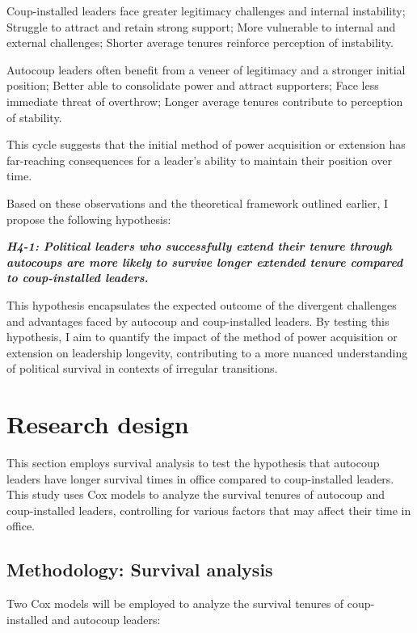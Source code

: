 \documentclass[
  12pt,
]{report}
\begin{document}
Coup-installed leaders face greater legitimacy challenges and internal
instability; Struggle to attract and retain strong support; More
vulnerable to internal and external challenges; Shorter average tenures
reinforce perception of instability.

Autocoup leaders often benefit from a veneer of legitimacy and a
stronger initial position; Better able to consolidate power and attract
supporters; Face less immediate threat of overthrow; Longer average
tenures contribute to perception of stability.

This cycle suggests that the initial method of power acquisition or
extension has far-reaching consequences for a leader's ability to
maintain their position over time.

Based on these observations and the theoretical framework outlined
earlier, I propose the following hypothesis:

\textbf{\emph{H4-1: Political leaders who successfully extend their
tenure through autocoups are more likely to survive longer extended
tenure compared to coup-installed leaders.}}

This hypothesis encapsulates the expected outcome of the divergent
challenges and advantages faced by autocoup and coup-installed leaders.
By testing this hypothesis, I aim to quantify the impact of the method
of power acquisition or extension on leadership longevity, contributing
to a more nuanced understanding of political survival in contexts of
irregular transitions.

\section{Research design}\label{research-design-1}

This section employs survival analysis to test the hypothesis that
autocoup leaders have longer survival times in office compared to
coup-installed leaders. This study uses Cox models to analyze the
survival tenures of autocoup and coup-installed leaders, controlling for
various factors that may affect their time in office.

\subsection{Methodology: Survival
analysis}\label{methodology-survival-analysis}

Two Cox models will be employed to analyze the survival tenures of
coup-installed and autocoup leaders:
\end{document}
